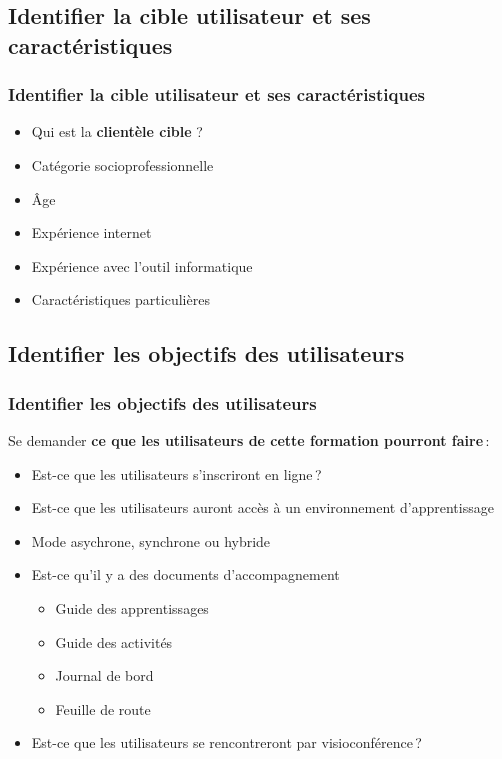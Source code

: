 	\subsection{Identifier la cible utilisateur et ses caractéristiques} 
		\begin{frame}[allowframebreaks]
		\frametitle{Identifier la cible utilisateur et ses caractéristiques \citep{ergolab2014a}}
			\begin {itemize}
				      \item Qui est la \textbf{clientèle cible }?
				      \item Catégorie socioprofessionnelle
					\item Âge
					\item Expérience internet
					\item Expérience avec l’outil informatique
					\item Caractéristiques particulières
			\end{itemize}
		\end{frame} 
		
	\subsection{Identifier les objectifs des utilisateurs} 
		\begin{frame}[allowframebreaks]
		\frametitle{Identifier les objectifs des utilisateurs \citep{ergolab2014a}}
		Se demander\textbf{ ce que les utilisateurs de cette formation pourront faire}\,:
			\begin {itemize}
				\item Est-ce que les utilisateurs s’inscriront en ligne\,?
				\item Est-ce que les utilisateurs auront accès à un environnement d’apprentissage
				\item Mode asychrone, synchrone ou hybride
				\item Est-ce qu'il y a des documents d’accompagnement
				\begin {itemize}
					\item Guide des apprentissages
					\item Guide des activités
					\item Journal de bord
					\item Feuille de route
				\end{itemize}
					\item Est-ce que les utilisateurs se rencontreront par visioconférence\,?

			\end{itemize}
		\end{frame}
		
